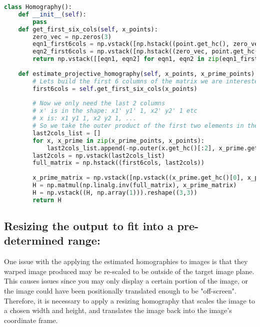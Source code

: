 \documentclass{article}
\begin{document}
\begin{lstlisting}[language=Python]
class Homography():
    def __init__(self):
        pass
    def get_first_six_cols(self, x_points):
        zero_vec = np.zeros(3)
        eqn1_first6cols = np.vstack([np.hstack((point.get_hc(), zero_vec)) for point in x_points])
        eqn2_first6cols = np.vstack([np.hstack((zero_vec, point.get_hc())) for point in x_points])
        return np.vstack([[eqn1, eqn2] for eqn1, eqn2 in zip(eqn1_first6cols, eqn2_first6cols)]) # Stack the rows in an interleaved fashion
        
    def estimate_projective_homography(self, x_points, x_prime_points):
        # Lets build the first 6 columns of the matrix we are interested in:
        first6cols = self.get_first_six_cols(x_points)
        
        # Now we only need the last 2 columns
        # x' is in the shape: x1' y1' 1, x2' y2' 1 etc
        # x is: x1 y1 1, x2 y2 1, ...
        # So we take the outer product of the first two elements in the homogeneous form to get the remaining portion:
        last2cols_list = []
        for x, x_prime in zip(x_prime_points, x_points):
            last2cols_list.append(-np.outer(x.get_hc()[:2], x_prime.get_hc()[:2]))
        last2cols = np.vstack(last2cols_list)
        full_matrix = np.hstack((first6cols, last2cols))
        
        x_prime_matrix = np.vstack([np.vstack((x_prime.get_hc()[0], x_prime.get_hc()[1])) for x_prime in x_prime_points])
        H = np.matmul(np.linalg.inv(full_matrix), x_prime_matrix)
        H = np.vstack((H, np.array(1))).reshape((3,3))
        return H
\end{lstlisting}


\subsection{Resizing the output to fit into a pre-determined range:}
One issue with the applying the estimated homographies to images is that they warped image produced may be re-scaled to be outside of the target image plane. This causes issues since you may only display a certain portion of the image, or the image could have been positionally translated enough to be "off-screen". Therefore, it is necessary to apply a resizing homography that scales the image to a chosen width and height, and translates the image back into the image's coordinate frame. 
\end{document}
